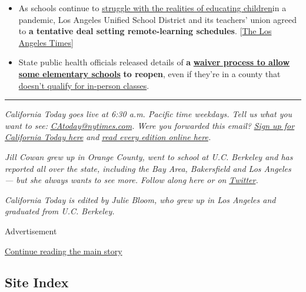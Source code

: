 \begin{itemize}
\item
  As schools continue to
  \href{https://www.nytimes.com/2020/08/03/us/school-closing-coronavirus.html?}{struggle
  with the realities of educating children}in a pandemic, Los Angeles
  Unified School District and its teachers' union agreed to \textbf{a
  tentative deal setting remote-learning schedules}.
  {[}\href{https://www.latimes.com/california/story/2020-08-03/lausd-teachers-reach-tentative-online-learning-pact}{The
  Los Angeles Times}{]}
\item
  State public health officials released details of \textbf{a}
  \textbf{\href{https://www.cdph.ca.gov/Programs/CID/DCDC/Pages/COVID-19/Schools-FAQ.aspx}{waiver
  process to allow some elementary schools}} \textbf{to reopen}, even if
  they're in a county that
  \href{https://www.nytimes.com/2020/07/17/us/california-schools-reopening-newsom.html}{doesn't
  qualify for in-person classes}.
\end{itemize}

\begin{center}\rule{0.5\linewidth}{\linethickness}\end{center}

\emph{California Today goes live at 6:30 a.m. Pacific time weekdays.
Tell us what you want to see:}
\href{mailto:CAtoday@nytimes.com}{\emph{CAtoday@nytimes.com}}\emph{.
Were you forwarded this email?}
\href{https://www.nytimes.com/newsletters/california-today?module=inline}{\emph{Sign
up for California Today here}} \emph{and}
\href{https://www.nytimes.com/column/california-today}{\emph{read every
edition online here}}\emph{.}

\emph{Jill Cowan grew up in Orange County, went to school at U.C.
Berkeley and has reported all over the state, including the Bay Area,
Bakersfield and Los Angeles --- but she always wants to see more. Follow
along here or on}
\href{https://twitter.com/JillCowan}{\emph{Twitter}}\emph{.}

\emph{California Today is edited by Julie Bloom, who grew up in Los
Angeles and graduated from U.C. Berkeley.}

Advertisement

\protect\hyperlink{after-bottom}{Continue reading the main story}

\hypertarget{site-index}{%
\subsection{Site Index}\label{site-index}}

